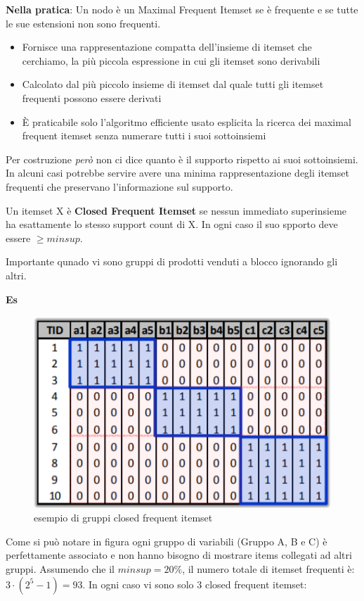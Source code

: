 \textbf{Nella pratica}: Un nodo \`e un Maximal Frequent Itemset se \`e frequente e se tutte le sue estensioni non sono frequenti.\\
\begin{itemize}
	\item Fornisce una rappresentazione compatta dell'insieme di itemset che cerchiamo, la pi\`u piccola espressione in cui gli itemset sono derivabili
	\item Calcolato dal più piccolo insieme di itemset dal quale tutti gli itemset frequenti possono essere derivati
	\item È praticabile solo l'algoritmo efficiente usato esplicita la ricerca dei maximal frequent itemset senza numerare tutti i suoi sottoinsiemi
\end{itemize}
Per costruzione \textit{per\`o} non ci dice quanto \`e il supporto rispetto ai suoi sottoinsiemi. In alcuni casi potrebbe servire avere una minima rappresentazione degli itemset frequenti che preservano l'informazione sul supporto.

\begin{defn}
	Un itemset X è \textbf{Closed Frequent Itemset} se nessun immediato superinsieme ha esattamente lo stesso support count di X. In ogni caso il suo spporto deve essere $\ge minsup$.
\end{defn}
Importante qunado vi sono gruppi di prodotti venduti a blocco ignorando gli altri.

\textbf{Es}
\begin{figure}[H]
	\centering
	\includegraphics[height=0.5 \linewidth]{association/pict/close_freq_itemset.png}
	\caption{esempio di gruppi closed frequent itemset}
\end{figure}

Come si può notare in figura ogni gruppo di variabili (Gruppo A, B e C) è perfettamente associato e non hanno bisogno di mostrare items collegati ad altri gruppi. Assumendo che il $minsup = 20\%$, il numero totale di itemset frequenti è: $3 \cdot (2^5 -1) = 93$. In ogni caso vi sono solo 3 closed frequent itemset: 

